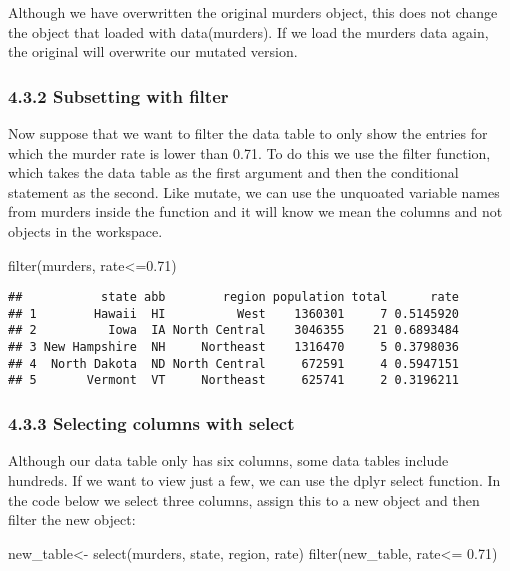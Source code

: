 \documentclass[
]{article}
\newenvironment{Shaded}{\begin{snugshade}}{\end{snugshade}}
\newcommand{\FloatTok}[1]{\textcolor[rgb]{0.00,0.00,0.81}{#1}}
\newcommand{\FunctionTok}[1]{\textcolor[rgb]{0.00,0.00,0.00}{#1}}
\newcommand{\NormalTok}[1]{#1}
\newcommand{\OtherTok}[1]{\textcolor[rgb]{0.56,0.35,0.01}{#1}}
\newcommand{\SpecialCharTok}[1]{\textcolor[rgb]{0.00,0.00,0.00}{#1}}
\begin{document}
Although we have overwritten the original murders object, this does not
change the object that loaded with data(murders). If we load the murders
data again, the original will overwrite our mutated version.

\hypertarget{subsetting-with-filter}{%
\subsubsection{4.3.2 Subsetting with
filter}\label{subsetting-with-filter}}

Now suppose that we want to filter the data table to only show the
entries for which the murder rate is lower than 0.71. To do this we use
the filter function, which takes the data table as the first argument
and then the conditional statement as the second. Like mutate, we can
use the unquoated variable names from murders inside the function and it
will know we mean the columns and not objects in the workspace.

\begin{Shaded}
\begin{Highlighting}[]
\FunctionTok{filter}\NormalTok{(murders, rate}\SpecialCharTok{\textless{}=}\FloatTok{0.71}\NormalTok{)}
\end{Highlighting}
\end{Shaded}

\begin{verbatim}
##           state abb        region population total      rate
## 1        Hawaii  HI          West    1360301     7 0.5145920
## 2          Iowa  IA North Central    3046355    21 0.6893484
## 3 New Hampshire  NH     Northeast    1316470     5 0.3798036
## 4  North Dakota  ND North Central     672591     4 0.5947151
## 5       Vermont  VT     Northeast     625741     2 0.3196211
\end{verbatim}

\hypertarget{selecting-columns-with-select}{%
\subsubsection{4.3.3 Selecting columns with
select}\label{selecting-columns-with-select}}

Although our data table only has six columns, some data tables include
hundreds. If we want to view just a few, we can use the dplyr select
function. In the code below we select three columns, assign this to a
new object and then filter the new object:

\begin{Shaded}
\begin{Highlighting}[]
\NormalTok{new\_table}\OtherTok{\textless{}{-}} \FunctionTok{select}\NormalTok{(murders, state, region, rate)}
\FunctionTok{filter}\NormalTok{(new\_table, rate}\SpecialCharTok{\textless{}=} \FloatTok{0.71}\NormalTok{)}
\end{Highlighting}
\end{Shaded}
\end{document}
